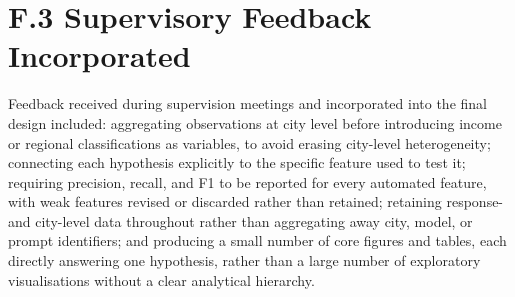 \section*{F.3 Supervisory Feedback Incorporated}

Feedback received during supervision meetings and incorporated into the final design included: aggregating observations at city level before introducing income or regional classifications as variables, to avoid erasing city-level heterogeneity; connecting each hypothesis explicitly to the specific feature used to test it; requiring precision, recall, and F1 to be reported for every automated feature, with weak features revised or discarded rather than retained; retaining response- and city-level data throughout rather than aggregating away city, model, or prompt identifiers; and producing a small number of core figures and tables, each directly answering one hypothesis, rather than a large number of exploratory visualisations without a clear analytical hierarchy.
